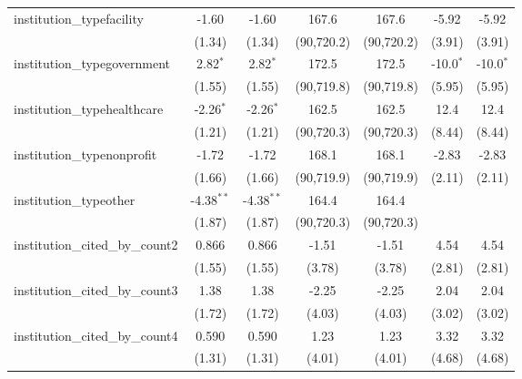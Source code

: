 \begin{tabular}{lcccccc}
   institution\_typefacility             & -1.60         & -1.60         & 167.6       & 167.6       & -5.92         & -5.92\\   
                                         & (1.34)        & (1.34)        & (90,720.2)  & (90,720.2)  & (3.91)        & (3.91)\\   
   institution\_typegovernment           & 2.82$^{*}$    & 2.82$^{*}$    & 172.5       & 172.5       & -10.0$^{*}$   & -10.0$^{*}$\\   
                                         & (1.55)        & (1.55)        & (90,719.8)  & (90,719.8)  & (5.95)        & (5.95)\\   
   institution\_typehealthcare           & -2.26$^{*}$   & -2.26$^{*}$   & 162.5       & 162.5       & 12.4          & 12.4\\   
                                         & (1.21)        & (1.21)        & (90,720.3)  & (90,720.3)  & (8.44)        & (8.44)\\   
   institution\_typenonprofit            & -1.72         & -1.72         & 168.1       & 168.1       & -2.83         & -2.83\\   
                                         & (1.66)        & (1.66)        & (90,719.9)  & (90,719.9)  & (2.11)        & (2.11)\\   
   institution\_typeother                & -4.38$^{**}$  & -4.38$^{**}$  & 164.4       & 164.4       &               &   \\   
                                         & (1.87)        & (1.87)        & (90,720.3)  & (90,720.3)  &               &   \\   
   institution\_cited\_by\_count2        & 0.866         & 0.866         & -1.51       & -1.51       & 4.54          & 4.54\\   
                                         & (1.55)        & (1.55)        & (3.78)      & (3.78)      & (2.81)        & (2.81)\\   
   institution\_cited\_by\_count3        & 1.38          & 1.38          & -2.25       & -2.25       & 2.04          & 2.04\\   
                                         & (1.72)        & (1.72)        & (4.03)      & (4.03)      & (3.02)        & (3.02)\\   
   institution\_cited\_by\_count4        & 0.590         & 0.590         & 1.23        & 1.23        & 3.32          & 3.32\\   
                                         & (1.31)        & (1.31)        & (4.01)      & (4.01)      & (4.68)        & (4.68)\\   

\end{tabular}
